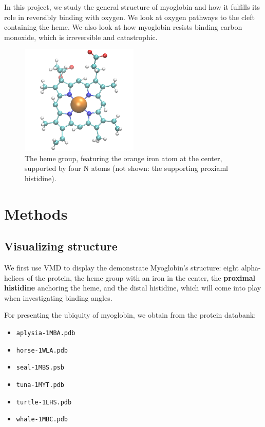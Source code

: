 \documentclass{article}
\begin{document}
In this project, we study the general structure of myoglobin and how it fulfills its role in reversibly binding with oxygen.  We look at oxygen pathways to the cleft containing the heme.  We also look at how myoglobin resists binding carbon monoxide, which is irreversible and catastrophic.

\begin{figure}
	\centering
	\includegraphics[width=0.5\textwidth]{heme.png}
        \caption{The heme group, featuring the orange iron atom at the center, supported by four N atoms (not shown: the supporting proxiaml histidine).}
	\label{fig:heme}
\end{figure}



\section{Methods}

\subsection{Visualizing structure}

We first use VMD to display the demonstrate Myoglobin's structure: eight alpha-helices of the protein, the heme group with an iron in the center, the \textbf{proximal histidine} anchoring the heme, and the distal histidine, which will come into play when investigating binding angles.

For presenting the ubiquity of myoglobin, we obtain from the protein databank:

\begin{itemize}
	\item \lstinline|aplysia-1MBA.pdb|
	\item \lstinline|horse-1WLA.pdb|
	\item \lstinline|seal-1MBS.psb|
	\item \lstinline|tuna-1MYT.pdb|
	\item \lstinline|turtle-1LHS.pdb|
	\item \lstinline|whale-1MBC.pdb|
\end{itemize}
\end{document}
